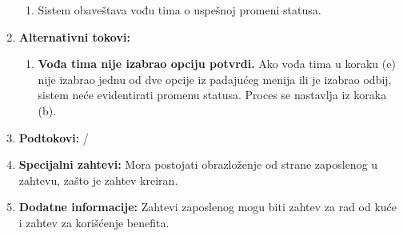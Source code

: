 \documentclass[a4paper]{article}
\begin{document}
\begin{enumerate}
\begin{enumerate}
            \item Sistem obaveštava vođu tima o uspešnoj promeni statusa.
        \end{enumerate}
    \item \textbf{Alternativni tokovi:}
        \begin{enumerate}
            \item \textbf{Vođa tima nije izabrao opciju potvrdi.} Ako vođa tima u koraku (e) nije izabrao jednu od dve opcije iz padajućeg menija ili je izabrao odbij, sistem neće evidentirati promenu statusa. Proces se nastavlja iz koraka (b).
        \end{enumerate}
    \item \textbf{Podtokovi:} /
    \item \textbf{Specijalni zahtevi:} Mora postojati obrazloženje od strane zaposlenog u zahtevu, zašto je zahtev kreiran.
    \item \textbf{Dodatne informacije:} Zahtevi zaposlenog mogu biti zahtev za rad od kuće i zahtev za korišćenje benefita.
\end{enumerate}
\newl
\end{document}
